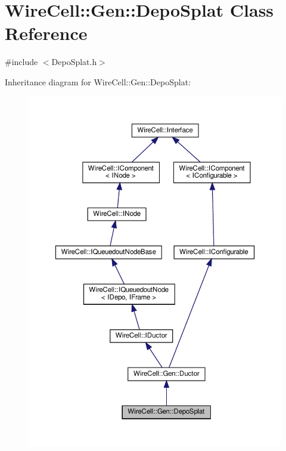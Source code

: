 \hypertarget{class_wire_cell_1_1_gen_1_1_depo_splat}{}\section{Wire\+Cell\+:\+:Gen\+:\+:Depo\+Splat Class Reference}
\label{class_wire_cell_1_1_gen_1_1_depo_splat}


{\ttfamily \#include $<$Depo\+Splat.\+h$>$}



Inheritance diagram for Wire\+Cell\+:\+:Gen\+:\+:Depo\+Splat\+:
\nopagebreak
\begin{figure}[H]
\begin{center}
\leavevmode
\includegraphics[width=350pt]{class_wire_cell_1_1_gen_1_1_depo_splat__inherit__graph}
\end{center}
\end{figure}


